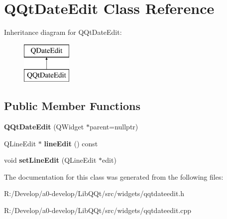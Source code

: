 \hypertarget{class_q_qt_date_edit}{}\section{Q\+Qt\+Date\+Edit Class Reference}
\label{class_q_qt_date_edit}
Inheritance diagram for Q\+Qt\+Date\+Edit\+:\begin{figure}[H]
\begin{center}
\leavevmode
\includegraphics[height=2.000000cm]{class_q_qt_date_edit}
\end{center}
\end{figure}
\subsection*{Public Member Functions}
\begin{DoxyCompactItemize}
\item 
\mbox{\label{class_q_qt_date_edit_a40391d55264c73ef9b09614c985881c9}} 
{\bfseries Q\+Qt\+Date\+Edit} (Q\+Widget $\ast$parent=nullptr)
\item 
\mbox{\label{class_q_qt_date_edit_a0883c9a18999c50a45c6cdd82668c80b}} 
Q\+Line\+Edit $\ast$ {\bfseries line\+Edit} () const
\item 
\mbox{\label{class_q_qt_date_edit_a814cec8323f5b8aba29ab25dc51d9433}} 
void {\bfseries set\+Line\+Edit} (Q\+Line\+Edit $\ast$edit)
\end{DoxyCompactItemize}


The documentation for this class was generated from the following files\+:\begin{DoxyCompactItemize}
\item 
R\+:/\+Develop/a0-\/develop/\+Lib\+Q\+Qt/src/widgets/qqtdateedit.\+h\item 
R\+:/\+Develop/a0-\/develop/\+Lib\+Q\+Qt/src/widgets/qqtdateedit.\+cpp\end{DoxyCompactItemize}
